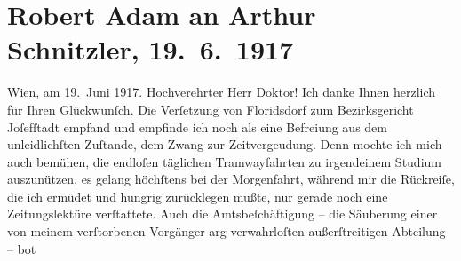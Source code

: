 

         
         \renewcommand{\erwaehntePersonen}{Personen: Richard Beer, Alexandre père Dumas, Aemilius Hacker, Viktor Franz Patzner, Maria Pollak}
         \renewcommand{\erwaehnteInstitutionen}{Institutionen: Bezirksgericht Wien Josefstadt}
         \renewcommand{\erwaehnteOrte}{Orte: Steiermark, VIII., Josefstadt, Wien, XXI., Floridsdorf, Zistersdorf}
         \renewcommand{\erwaehnteWerke}{Werke: Das Ende des Judas, Meine Memoiren}
               \section[Robert Adam an Arthur Schnitzler, 19. 6. 1917]{ Robert Adam an Arthur Schnitzler, 19. 6. 1917}\nopagebreak{}\rehead{ }\begin{ledgroupsized}[t]{13cm}\normalsize\beginnumbering \toendnotes[C]{\smallbreak\pagebreak[2]} 
\toendnotes[C]{\smallbreak}\pstart
           \raggedleft{}{\pb}Wien, am 19. Juni 1917. \pend
           \pstart{}Hochverehrter Herr Doktor!\pend\pstart
           Ich danke Ihnen herzlich für Ihren Glückwunſch. Die Verſetzung von Floridsdorf zum Bezirksgericht Joſefſtadt empfand und empfinde ich noch als eine Befreiung aus dem unleidlichſten
               Zuſtande, dem Zwang zur Zeitvergeudung. Denn mochte ich mich auch bemühen, die
               endloſen täglichen Tramwayfahrten zu irgendeinem Studium auszunützen, es gelang
               höchſtens bei der Morgenfahrt, während mir die Rückreiſe, die ich ermüdet und hungrig
               zurücklegen mußte, nur gerade noch eine Zeitungslektüre {\pb}verſtattete. Auch die Amtsbeſchäftigung – die
               Säuberung einer von meinem verſtorbenen Vorgänger arg verwahrloſten außerſtreitigen Abteilung – bot

\end{ledgroupsized}
